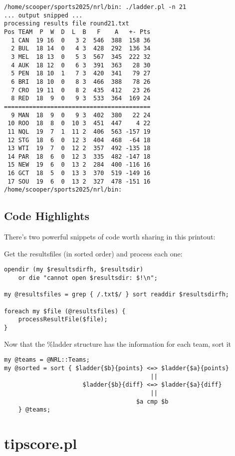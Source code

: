 \documentclass{article}      %
\begin{document}
\begin{verbatim}
/home/scooper/sports2025/nrl/bin: ./ladder.pl -n 21
... output snipped ...
processing results file round21.txt
Pos TEAM  P  W  D  L  B   F    A   +- Pts
  1 CAN  19 16  0   3 2  546  388  158 36
  2 BUL  18 14  0   4 3  428  292  136 34
  3 MEL  18 13  0   5 3  567  345  222 32
  4 AUK  18 12  0   6 3  391  363   28 30
  5 PEN  18 10  1   7 3  420  341   79 27
  6 BRI  18 10  0   8 3  466  388   78 26
  7 CRO  19 11  0   8 2  435  412   23 26
  8 RED  18  9  0   9 3  533  364  169 24
=========================================
  9 MAN  18  9  0   9 3  402  380   22 24
 10 ROO  18  8  0  10 3  451  447    4 22
 11 NQL  19  7  1  11 2  406  563 -157 19
 12 STG  18  6  0  12 3  404  468  -64 18
 13 WTI  19  7  0  12 2  357  492 -135 18
 14 PAR  18  6  0  12 3  335  482 -147 18
 15 NEW  19  6  0  13 2  284  400 -116 16
 16 GCT  18  5  0  13 3  370  519 -149 16
 17 SOU  19  6  0  13 2  327  478 -151 16
/home/scooper/sports2025/nrl/bin:
\end{verbatim}

\subsection{Code Highlights}

There's two powerful snippets of code worth sharing in this printout:

Get the resultsfiles (in sorted order) and process each one:
\begin{verbatim}
opendir (my $resultsdirfh, $resultsdir)
    or die "cannot open $resultsdir: $!\n";

my @resultsfiles = grep { /.txt$/ } sort readdir $resultsdirfh;

foreach my $file (@resultsfiles) {
    processResultFile($file);
}

\end{verbatim}

Now that the \%ladder structure has the information for each team,
sort it

\begin{verbatim}
my @teams = @NRL::Teams;
my @sorted = sort { $ladder{$b}{points} <=> $ladder{$a}{points}
                                         ||
                      $ladder{$b}{diff} <=> $ladder{$a}{diff}
                                         ||
                                     $a cmp $b
    } @teams;
\end{verbatim}

\section{tipscore.pl}
\end{document}
